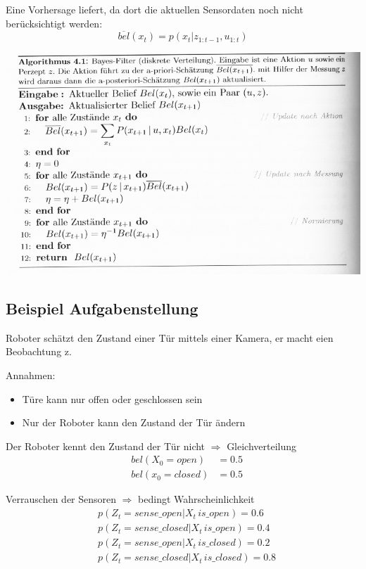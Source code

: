 Eine Vorhersage liefert, da dort die aktuellen Sensordaten noch nicht
berücksichtigt werden:
$$
	\overline{bel}(x_t) = p(x_t | z_{1:t-1}, u_{1:t})
$$
\begin{center}
	\includegraphics[scale=0.4]{Resources/PNG/hertzberg-132-bayes-algorithmus.png}
\end{center}

\subsection{Beispiel Aufgabenstellung}
Roboter schätzt den Zustand einer Tür mittels einer Kamera, er macht eien
Beobachtung z.

Annahmen:
\begin{itemize}
	\item Türe kann nur offen oder geschlossen sein
	\item Nur der Roboter kann den Zustand der Tür ändern
\end{itemize}

Der Roboter kennt den Zustand der Tür nicht $\Rightarrow$ Gleichverteilung
\begin{align*}
	&bel(X_0 = open) &= 0.5 \\
	&bel(x_0 = closed) &= 0.5
\end{align*}

Verrauschen der Sensoren $\Rightarrow$ bedingt Wahrscheinlichkeit
\begin{align*}
	&p(Z_t = sense\_open | X_t\, is\_open) = 0.6 \\
	&p(Z_t = sense\_closed | X_t\, is\_open) = 0.4 \\
	&p(Z_t = sense\_open | X_t\, is\_closed) = 0.2 \\
	&p(Z_t = sense\_closed | X_t\, is\_closed) = 0.8
\end{align*}

